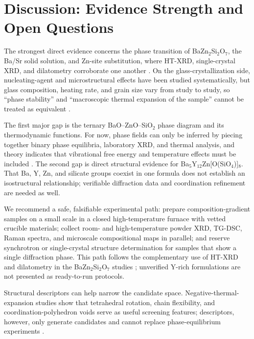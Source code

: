 \section{Discussion: Evidence Strength and Open Questions}

The strongest direct evidence concerns the phase transition of BaZn$_2$Si$_2$O$_7$, the Ba\slash Sr solid solution, and Zn-site substitution, where HT\nobreakdash-XRD, single-crystal XRD, and dilatometry corroborate one another \cite{lin1999phase,thieme2015ba1,kerstan2012thermal,thieme2016new}. On the glass-crystallization side, nucleating-agent and microstructural effects have been studied systematically, but glass composition, heating rate, and grain size vary from study to study, so ``phase stability'' and ``macroscopic thermal expansion of the sample'' cannot be treated as equivalent \cite{thieme2016thermal,vladislavova2018crystallisation}.

The first major gap is the ternary BaO--ZnO--SiO$_2$ phase diagram and its thermodynamic functions. For now, phase fields can only be inferred by piecing together binary phase equilibria, laboratory XRD, and thermal analysis, and theory indicates that vibrational free energy and temperature effects must be included \cite{erlebach2021phase}. The second gap is direct structural evidence for Ba$_5$Y$_{12}$Zn[O(SiO$_4$)]$_8$. That Ba, Y, Zn, and silicate groups coexist in one formula does not establish an isostructural relationship; verifiable diffraction data and coordination refinement are needed as well.

We recommend a safe, falsifiable experimental path: prepare composition-gradient samples on a small scale in a closed high-temperature furnace with vetted crucible materials; collect room- and high-temperature powder XRD, TG\nobreakdash-DSC, Raman spectra, and microscale compositional maps in parallel; and reserve synchrotron or single-crystal structure determination for samples that show a single diffraction phase. This path follows the complementary use of HT\nobreakdash-XRD and dilatometry in the BaZn$_2$Si$_2$O$_7$ studies \cite{kerstan2012thermal,thieme2016very}; unverified Y-rich formulations are not presented as ready-to-run protocols.

Structural descriptors can help narrow the candidate space. Negative-thermal-expansion studies show that tetrahedral rotation, chain flexibility, and coordination-polyhedron voids serve as useful screening features; descriptors, however, only generate candidates and cannot replace phase-equilibrium experiments \cite{kireeva2022pauling,erlebach2021phase}.
